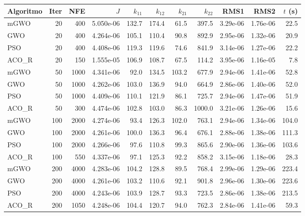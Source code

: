 \begin{tabular}{lrrrrrrrrrr}
\hline
Algoritmo & Iter & NFE & $J$ & $k_{11}$ & $k_{12}$ & $k_{21}$ & $k_{22}$ & RMS1 & RMS2 & $t$ (s) \\
\hline
mGWO & 20 & 400 & 5.050e-06 & 132.7 & 174.4 & 61.5 & 397.5 & 3.29e-06 & 1.76e-06 & 22.5 \\
GWO & 20 & 400 & 4.264e-06 & 105.1 & 110.4 & 90.8 & 892.9 & 2.95e-06 & 1.32e-06 & 20.9 \\
PSO & 20 & 400 & 4.408e-06 & 119.3 & 119.6 & 74.6 & 841.9 & 3.14e-06 & 1.27e-06 & 22.2 \\
ACO\_R & 20 & 150 & 1.555e-05 & 106.9 & 108.7 & 67.5 & 114.2 & 3.95e-06 & 1.16e-05 & 7.8 \\
mGWO & 50 & 1000 & 4.341e-06 & 92.0 & 134.5 & 103.2 & 677.9 & 2.94e-06 & 1.41e-06 & 52.8 \\
GWO & 50 & 1000 & 4.262e-06 & 103.0 & 136.9 & 94.0 & 664.9 & 2.86e-06 & 1.40e-06 & 52.0 \\
PSO & 50 & 1000 & 4.409e-06 & 110.1 & 121.9 & 86.1 & 725.7 & 2.94e-06 & 1.47e-06 & 51.9 \\
ACO\_R & 50 & 300 & 4.474e-06 & 102.8 & 103.0 & 86.3 & 1000.0 & 3.21e-06 & 1.26e-06 & 15.6 \\
mGWO & 100 & 2000 & 4.274e-06 & 93.4 & 126.3 & 102.0 & 763.1 & 2.94e-06 & 1.34e-06 & 104.0 \\
GWO & 100 & 2000 & 4.261e-06 & 100.0 & 136.3 & 96.4 & 676.1 & 2.88e-06 & 1.38e-06 & 111.3 \\
PSO & 100 & 2000 & 4.266e-06 & 97.6 & 110.8 & 99.3 & 865.6 & 2.90e-06 & 1.36e-06 & 103.6 \\
ACO\_R & 100 & 550 & 4.337e-06 & 97.1 & 125.3 & 92.2 & 858.2 & 3.15e-06 & 1.18e-06 & 28.3 \\
mGWO & 200 & 4000 & 4.283e-06 & 104.2 & 128.8 & 89.5 & 768.4 & 2.99e-06 & 1.29e-06 & 223.4 \\
GWO & 200 & 4000 & 4.261e-06 & 103.2 & 110.6 & 92.1 & 901.8 & 2.96e-06 & 1.30e-06 & 223.6 \\
PSO & 200 & 4000 & 4.243e-06 & 103.9 & 128.7 & 93.3 & 723.5 & 2.86e-06 & 1.38e-06 & 213.5 \\
ACO\_R & 200 & 1050 & 4.248e-06 & 104.4 & 120.7 & 94.0 & 762.3 & 2.84e-06 & 1.41e-06 & 59.3 \\
\hline
\end{tabular}
